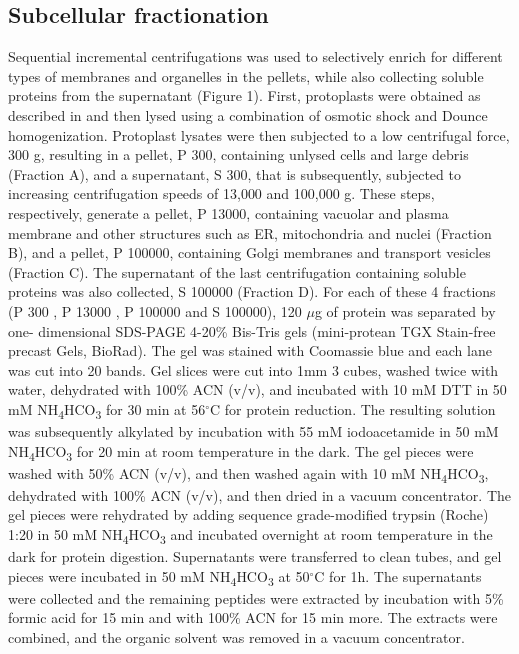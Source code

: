\subsection*{Subcellular fractionation}

Sequential incremental centrifugations was used to selectively enrich for different types of
membranes and organelles in the pellets, while also collecting soluble proteins from the
supernatant (Figure 1). First, protoplasts were obtained as described in \citep{Pitarch2006} and
then lysed using a combination of osmotic shock and Dounce homogenization. Protoplast
lysates were then subjected to a low centrifugal force, 300 g, resulting in a pellet, P 300,
containing unlysed cells and large debris (Fraction A), and a supernatant, S 300, that is
subsequently, subjected to increasing centrifugation speeds of 13,000 and 100,000 g. These
steps, respectively, generate a pellet, P 13000, containing vacuolar and plasma membrane and
other structures such as ER, mitochondria and nuclei (Fraction B), and a pellet, P 100000,
containing Golgi membranes and transport vesicles (Fraction C). The supernatant of the last
centrifugation containing soluble proteins was also collected, S 100000 (Fraction D). For each of
these 4 fractions (P 300 , P 13000 , P 100000 and S 100000), 120 $\mu$g of protein was separated by one-
dimensional SDS-PAGE 4-20\% Bis-Tris gels (mini-protean TGX Stain-free precast Gels,
BioRad). The gel was stained with Coomassie blue and each lane was cut into 20 bands. Gel
slices were cut into 1mm 3 cubes, washed twice with water, dehydrated with 100\% ACN (v/v),
 and incubated with 10 mM DTT in 50 mM NH\textsubscript{4}HCO\textsubscript{3} for 30 min at 56$^{\circ}$C for protein
reduction. The resulting solution was subsequently alkylated by incubation with 55 mM
iodoacetamide in 50 mM NH\textsubscript{4}HCO\textsubscript{3} for 20 min at room temperature in the dark. The gel
pieces were washed with 50\% ACN (v/v), and then washed again with 10 mM NH\textsubscript{4}HCO\textsubscript{3},
dehydrated with 100\% ACN (v/v), and then dried in a vacuum concentrator. The gel pieces were
rehydrated by adding sequence grade-modified trypsin (Roche) 1:20 in 50 mM NH\textsubscript{4}HCO\textsubscript{3} and
incubated overnight at room temperature in the dark for protein digestion. Supernatants were
transferred to clean tubes, and gel pieces were incubated in 50 mM NH\textsubscript{4}HCO\textsubscript{3} at 50$^{\circ}$C for
1h. The supernatants were collected and the remaining peptides were extracted by
incubation with 5\% formic acid for 15 min and with 100\% ACN for 15 min more. The extracts
were combined, and the organic solvent was removed in a vacuum concentrator.


